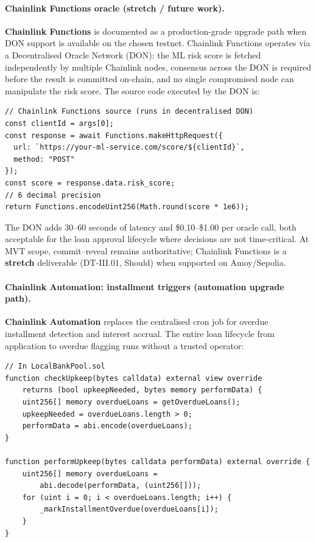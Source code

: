 \documentclass[12pt,a4paper]{report}
\begin{document}
\paragraph{Chainlink Functions oracle (stretch / future work).}
\textbf{Chainlink Functions} is documented as a production-grade upgrade path when DON support is available on the chosen testnet. Chainlink Functions operates via a Decentralised Oracle Network (DON): the ML risk score is fetched independently by multiple Chainlink nodes, consensus across the DON is required before the result is committed on-chain, and no single compromised node can manipulate the risk score. The source code executed by the DON is:

\begin{verbatim}
// Chainlink Functions source (runs in decentralised DON)
const clientId = args[0];
const response = await Functions.makeHttpRequest({
  url: `https://your-ml-service.com/score/${clientId}`,
  method: "POST"
});
const score = response.data.risk_score;
// 6 decimal precision
return Functions.encodeUint256(Math.round(score * 1e6));
\end{verbatim}

The DON adds 30--60 seconds of latency and \$0.10--\$1.00 per oracle call, both acceptable for the loan approval lifecycle where decisions are not time-critical. At MVT scope, commit--reveal remains authoritative; Chainlink Functions is a \textbf{stretch} deliverable (DT-III.01, Should) when supported on Amoy/Sepolia.

\paragraph{Chainlink Automation: installment triggers (automation upgrade path).}
\textbf{Chainlink Automation} replaces the centralised cron job for overdue installment detection and interest accrual. The entire loan lifecycle from application to overdue flagging runs without a trusted operator:

\begin{verbatim}
// In LocalBankPool.sol
function checkUpkeep(bytes calldata) external view override
    returns (bool upkeepNeeded, bytes memory performData) {
    uint256[] memory overdueLoans = getOverdueLoans();
    upkeepNeeded = overdueLoans.length > 0;
    performData = abi.encode(overdueLoans);
}

function performUpkeep(bytes calldata performData) external override {
    uint256[] memory overdueLoans =
        abi.decode(performData, (uint256[]));
    for (uint i = 0; i < overdueLoans.length; i++) {
        _markInstallmentOverdue(overdueLoans[i]);
    }
}
\end{verbatim}
\end{document}

